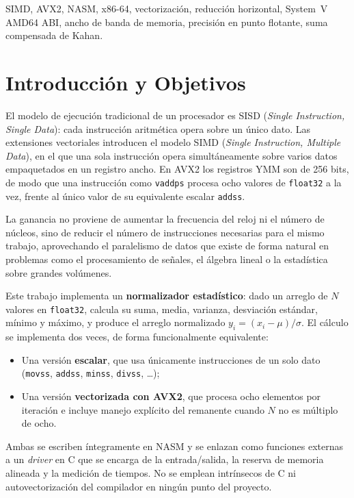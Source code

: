 \documentclass[journal]{IEEEtran}
\begin{document}
\begin{IEEEkeywords}
SIMD, AVX2, NASM, x86-64, vectorización, reducción horizontal,
System~V AMD64 ABI, ancho de banda de memoria, precisión en punto
flotante, suma compensada de Kahan.
\end{IEEEkeywords}

\section{Introducción y Objetivos}

El modelo de ejecución tradicional de un procesador es SISD
(\textit{Single Instruction, Single Data}): cada instrucción aritmética
opera sobre un único dato. Las extensiones vectoriales introducen el
modelo SIMD (\textit{Single Instruction, Multiple Data}), en el que una
sola instrucción opera simultáneamente sobre varios datos empaquetados
en un registro ancho. En AVX2 los registros YMM son de 256 bits, de modo
que una instrucción como \texttt{vaddps} procesa ocho valores de
\texttt{float32} a la vez, frente al único valor de su equivalente
escalar \texttt{addss}.

La ganancia no proviene de aumentar la frecuencia del reloj ni el número
de núcleos, sino de reducir el número de instrucciones necesarias para
el mismo trabajo, aprovechando el paralelismo de datos que existe de forma
natural en problemas como el procesamiento de señales, el álgebra
lineal o la estadística sobre grandes volúmenes.

Este trabajo implementa un \textbf{normalizador estadístico}: dado un
arreglo de $N$ valores en \texttt{float32}, calcula su suma, media,
varianza, desviación estándar, mínimo y máximo, y
produce el arreglo normalizado $y_i = (x_i - \mu)/\sigma$. El cálculo se
implementa dos veces, de forma funcionalmente equivalente:

\begin{itemize}
  \item Una versión \textbf{escalar}, que usa únicamente instrucciones
        de un solo dato (\texttt{movss}, \texttt{addss}, \texttt{minss},
        \texttt{divss}, \dots);
  \item Una versión \textbf{vectorizada con AVX2}, que procesa ocho
        elementos por iteración e incluye manejo explícito del
        remanente cuando $N$ no es múltiplo de ocho.
\end{itemize}

Ambas se escriben íntegramente en NASM y se enlazan como funciones
externas a un \textit{driver} en C que se encarga de la entrada/salida, la
reserva de memoria alineada y la medición de tiempos. No se emplean
intrínsecos de C ni autovectorización del compilador en ningún punto
del proyecto.
\end{document}
